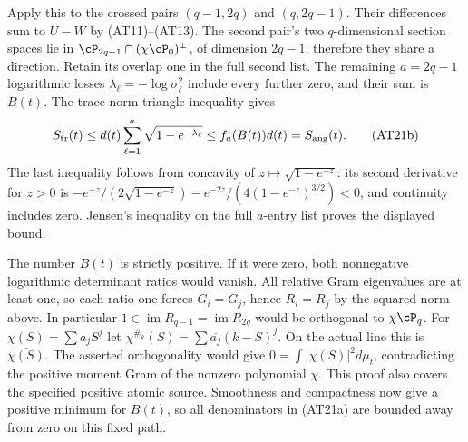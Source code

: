 Apply this to the crossed pairs $(q-1,2q)$ and $(q,2q-1)$.
Their differences sum to $U-W$ by (AT11)--(AT13). The second
pair's two $q$-dimensional section spaces lie in
$\cP_{2q-1}\cap(\chi\cP_0)^\perp$, of dimension $2q-1$;
therefore they share a direction. Retain its overlap one in the
full second list. The remaining $a=2q-1$ logarithmic losses
$\lambda_\ell=-\log\sigma_\ell^2$ include every further zero,
and their sum is $B(t)$. The trace-norm triangle inequality gives
\[
S_{\rm tr}(t)\le d(t)\sum_{\ell=1}^{a}\sqrt{1-e^{-\lambda_\ell}}
 \le f_a(B(t))d(t)=S_{\rm ang}(t).\tag{AT21b}
\]
The last inequality follows from concavity of
$z\mapsto\sqrt{1-e^{-z}}$: its second derivative for $z>0$ is
$-e^{-z}/(2\sqrt{1-e^{-z}})-e^{-2z}/(4(1-e^{-z})^{3/2})<0$,
and continuity includes zero. Jensen's inequality on the full
$a$-entry list proves the displayed bound.

The number $B(t)$ is strictly positive. If it were zero, both
nonnegative logarithmic determinant ratios would vanish. All relative
Gram eigenvalues are at least one, so each ratio one forces
$G_i=G_j$, hence $R_i=R_j$ by the squared norm above. In particular
$1\in\operatorname{im}R_{q-1}=\operatorname{im}R_{2q}$ would be
orthogonal to $\chi\cP_q$. For
$\chi(S)=\sum a_jS^j$ let
$\chi^{\#_k}(S)=\sum\overline{a_j}(k-S)^j$. On the actual line
this is $\overline{\chi(S)}$. The asserted orthogonality would give
$0=\int|\chi(S)|^2d\mu_t$, contradicting the positive moment
Gram of the nonzero polynomial $\chi$. This proof also covers the
specified positive atomic source. Smoothness and compactness now
give a positive minimum for $B(t)$, so all denominators in (AT21a)
are bounded away from zero on this fixed path.

